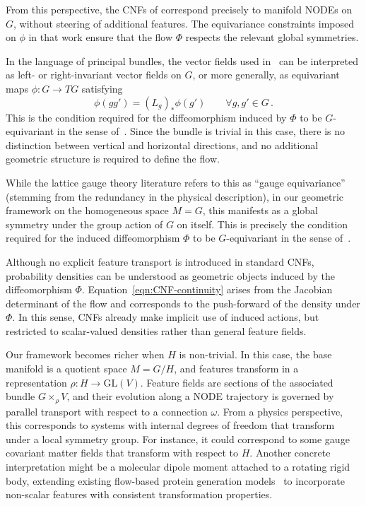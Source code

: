 \documentclass[12pt,a4paper]{article}
\numberwithin{equation}{section}
\theoremstyle{plain}
\theoremstyle{definition}
\theoremstyle{remark}
\begin{document}
From this perspective, the CNFs of \cite{Gerdes2024} correspond precisely to manifold NODEs on $G$, without steering of additional features. The equivariance constraints imposed on $\phi$ in that work ensure that the flow $\Phi$ respects the relevant global symmetries.

In the language of principal bundles, the vector fields used in~\cite{Gerdes2024} can be interpreted as left- or right-invariant vector fields on $G$, or more generally, as equivariant maps $\phi : G \to TG$ satisfying
\begin{equation}
    \phi(g g') = (L_g)_* \phi(g') \qquad \forall g,g' \in G \,.
\end{equation}
This is the condition required for the diffeomorphism induced by $\Phi$ to be $G$-equivariant in the sense of~. Since the bundle is trivial in this case, there is no distinction between vertical and horizontal directions, and no additional geometric structure is required to define the flow.

While the lattice gauge theory literature refers to this as ``gauge equivariance'' (stemming from the redundancy in the physical description), in our geometric framework on the homogeneous space $M=G$, this manifests as a global symmetry under the group action of $G$ on itself. This is precisely the condition required for the induced diffeomorphism $\Phi$ to be $G$-equivariant in the sense of~.

Although no explicit feature transport is introduced in standard CNFs, probability densities can be understood as geometric objects induced by the diffeomorphism $\Phi$. 
Equation~\eqref{eqn:CNF-continuity} arises from the Jacobian determinant of the flow and corresponds to the push-forward of the density under $\Phi$.
In this sense, CNFs already make implicit use of induced actions, but restricted to scalar-valued densities rather than general feature fields.

Our framework becomes richer when $H$ is non-trivial. In this case, the base manifold is a quotient space $M = G/H$, and features transform in a representation $\rho : H \to \mathrm{GL}(V)$. Feature fields are sections of the associated bundle $G \times_\rho V$, and their evolution along a NODE trajectory is governed by parallel transport with respect to a connection $\omega$. From a physics perspective, this corresponds to systems with internal degrees of freedom that transform under a local symmetry group. For instance, it could correspond to some gauge covariant matter fields that transform with respect to $H$. Another concrete interpretation might be a molecular dipole moment attached to a rotating rigid body, extending existing flow-based protein generation models~\cite{Yim2023,Bose2024,GarciaSatorras2021} to incorporate non-scalar features with consistent transformation properties.
\end{document}
